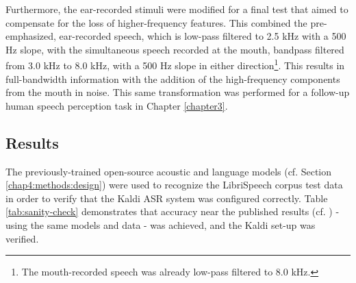 Furthermore, the ear-recorded stimuli were modified for a final test that aimed to compensate for the loss of higher-frequency features.  This combined the pre-emphasized, ear-recorded speech, which is low-pass filtered to 2.5 kHz with a 500 Hz slope, with the simultaneous speech recorded at the mouth, bandpass filtered from 3.0 kHz to 8.0 kHz, with a 500 Hz slope in either direction\footnote{The mouth-recorded speech was already low-pass filtered to 8.0 kHz.}. This results in full-bandwidth information with the addition of the high-frequency components from the mouth in noise. 
This same transformation was performed for a follow-up human speech perception task in Chapter \ref{chapter3}.







\subsection{Results}
\label{chap4:results}

The previously-trained open-source acoustic and language models (cf. Section \ref{chap4:methods:design}) were used to recognize the LibriSpeech corpus test data in order to verify that the Kaldi ASR system was configured correctly.  Table \ref{tab:sanity-check} demonstrates that accuracy near the published results (cf. \cite{panayotov:15}) - using the same models and data - was achieved, and the Kaldi set-up was verified.


